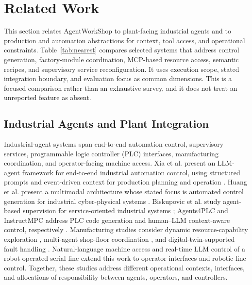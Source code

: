 \section{Related Work}
\label{sec:related}
This section relates AgentWorkShop to plant-facing industrial agents and to
production and automation abstractions for context, tool access, and
operational constraints. Table~\ref{tab:nearest} compares selected systems
that address control generation, factory-module coordination, MCP-based
resource access, semantic recipes, and supervisory service reconfiguration.
It uses execution scope, stated integration boundary, and evaluation focus as
common dimensions. This is a focused comparison rather than an exhaustive
survey, and it does not treat an unreported feature as absent.

\subsection{Industrial Agents and Plant Integration}
Industrial-agent systems span end-to-end automation control, supervisory
services, programmable logic controller (PLC) interfaces, manufacturing
coordination, and operator-facing machine access. Xia et al. present an
LLM-agent framework for end-to-end industrial automation control, using
structured prompts and event-driven context for production planning and
operation \cite{xia2025control}. Huang et al. present a multimodal
architecture whose stated focus is automated control generation for
industrial cyber-physical systems \cite{huang2026made}. Biskupovic et al.
study agent-based supervision for service-oriented industrial systems
\cite{biskupovic2025supervision};
Agents4PLC and InstructMPC address PLC code generation and human--LLM
context-aware control, respectively
\cite{liu2026agents4plc,wu2025instructmpc}. Manufacturing studies consider
dynamic resource-capability exploration \cite{lim2025llmenabled}, multi-agent
shop-floor coordination \cite{zhao2026shopfloor}, and digital-twin-supported
fault handling \cite{gill2025llmdt}. Natural-language machine access
\cite{hofmann2025nlc} and real-time LLM control of a robot-operated serial
line \cite{waseem2026pretrained} extend this work to operator interfaces and
robotic-line control. Together, these studies address different operational
contexts, interfaces, and allocations of responsibility between agents,
operators, and controllers.

